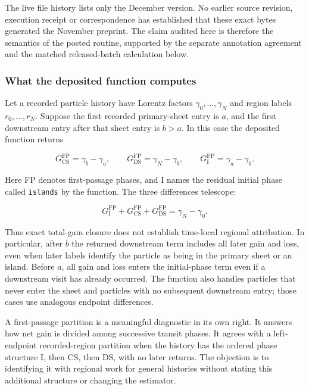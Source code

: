 The live file history lists only the December version. No earlier source
revision, execution receipt or correspondence has established that these
exact bytes generated the November preprint. The claim audited here is
therefore the semantics of the posted routine, supported by the separate
annotation agreement and the matched released-batch calculation below.

\subsubsection{What the deposited function
computes}\label{what-the-deposited-function-computes}

Let a recorded particle history have Lorentz factors
\(\gamma_0,\ldots,\gamma_N\) and region labels \(r_0,\ldots,r_N\).
Suppose the first recorded primary-sheet entry is \(a\), and the first
downstream entry after that sheet entry is \(b>a\). In this case the
deposited function returns

\[
G_{\mathrm{CS}}^{\mathrm{FP}}=\gamma_b-\gamma_a,\qquad
G_{\mathrm{DS}}^{\mathrm{FP}}=\gamma_N-\gamma_b,\qquad
G_{\mathrm{I}}^{\mathrm{FP}}=\gamma_a-\gamma_0.
\]

Here FP denotes first-passage phases, and I names the residual initial
phase called \nolinkurl{islands} by the function. The three differences
telescope:

\[
G_{\mathrm{I}}^{\mathrm{FP}}+G_{\mathrm{CS}}^{\mathrm{FP}}
+G_{\mathrm{DS}}^{\mathrm{FP}}=\gamma_N-\gamma_0.
\]

Thus exact total-gain closure does not establish time-local regional
attribution. In particular, after \(b\) the returned downstream term
includes all later gain and loss, even when later labels identify the
particle as being in the primary sheet or an island. Before \(a\), all
gain and loss enters the initial-phase term even if a downstream visit
has already occurred. The function also handles particles that never
enter the sheet and particles with no subsequent downstream entry; those
cases use analogous endpoint differences.

A first-passage partition is a meaningful diagnostic in its own right.
It answers how net gain is divided among successive transit phases. It
agrees with a left-endpoint recorded-region partition when the history
has the ordered phase structure I, then CS, then DS, with no later
returns. The objection is to identifying it with regional work for
general histories without stating this additional structure or changing
the estimator.

